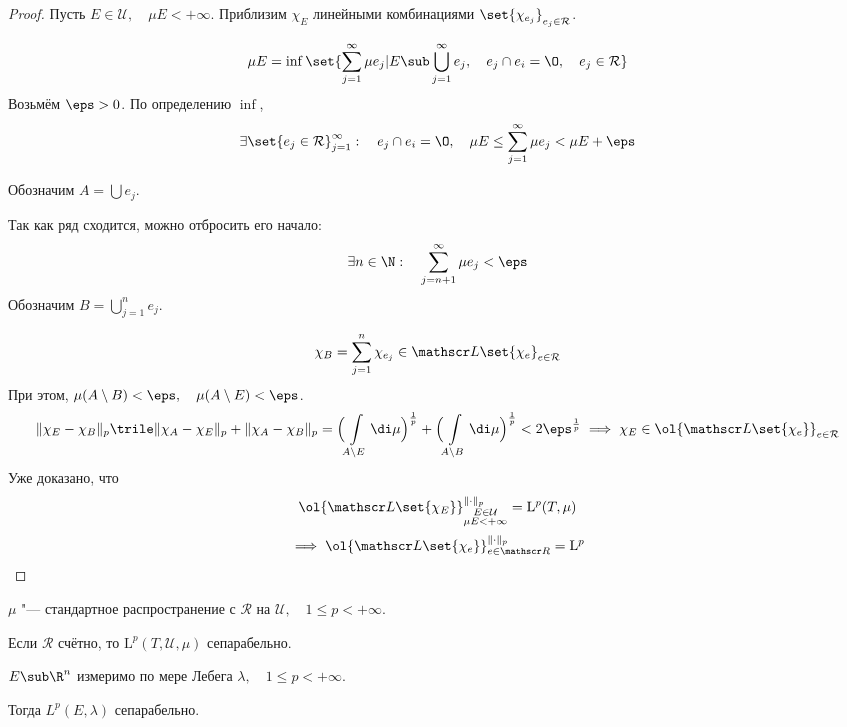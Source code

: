 \begin{proof}
	Пусть $ E \in \mathcal U, \quad \mu E < +\infty $.
	Приблизим $ \chi_E $ линейными комбинациями $ \set{\chi_{e_j}}_{e_j \in \mathcal R} $.

	$$ \mu E = \inf \set{ \sum_{j = 1}^\infty \mu e_j | E \sub \bigcup_{j = 1}^\infty e_j, \quad e_j \cap e_i = \O, \quad e_j \in \mathcal R} $$
	Возьмём $ \eps > 0 $.
	По определению $ \inf $,
	$$ \exists \set{e_j \in \mathcal R}_{j = 1}^\infty : \quad e_j \cap e_i = \O, \quad
	\mu E \le \sum_{j = 1}^\infty \mu e_j < \mu E + \eps $$

	Обозначим $ A = \bigcup e_j $.

	Так как ряд сходится, можно отбросить его начало:
	$$ \exists n \in \N : \quad \sum_{j = n + 1}^\infty \mu e_j < \eps $$
	Обозначим $ B = \bigcup_{j = 1}^n e_j $.

	$$ \chi_B = \sum_{j = 1}^n \chi_{e_j} \in \mathscr L\set{\chi_e}_{e \in \mathcal R} $$
	При этом, $ \mu (A \setminus B) < \eps, \quad \mu (A \setminus E) < \eps $.
	$$ \|\chi_E - \chi_B\|_p \trile \|\chi_A - \chi_E\|_p + \|\chi_A - \chi_B\|_p =
	\Bigl( \int\limits_{A \setminus E} \di \mu \Bigr)^{\frac1p} + \Bigl( \int\limits_{A \setminus B} \di \mu \Bigr)^{\frac1p} < 2\eps^{\frac1p}
	\implies \chi_E \in \ol{\mathscr L\set{\chi_e}}_{e \in \mathcal R} $$
	Уже доказано, что
	$$ \ol{\mathscr L\set{\chi_E}}_{
		\begin{subarray}{c}
			E \in \mathcal U \\
			\mu E < +\infty
		\end{subarray}}^{\|\cdot\|_p} = \mathrm L^p(T, \mu) $$
		$$ \implies \ol{\mathscr L\set{\chi_e}}_{e \in \mathscr R}^{\|\cdot\|_p} = \mathrm L^p $$
\end{proof}

\begin{implication}
	$ \mu $ "--- стандартное распространение с $ \mathcal R $ на $ \mathcal U, \quad 1 \le p < +\infty $.

	Если $ \mathcal R $ счётно, то $ \mathrm L^p(T, \mathcal U, \mu) $ сепарабельно.
\end{implication}

\begin{implication}
	$ E \sub \R^n $ измеримо по мере Лебега $ \lambda, \quad 1 \le p < +\infty $.

	Тогда $ L^p(E, \lambda) $ сепарабельно.
\end{implication}


